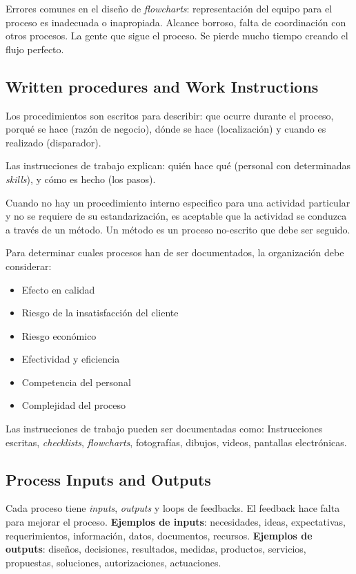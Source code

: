 \documentclass[]{article}
\begin{document}
Errores comunes en el diseño de \textit{flowcharts}: representación del equipo para el proceso es inadecuada o inapropiada. Alcance borroso, falta de coordinación con otros procesos. La gente que sigue el proceso. Se pierde mucho tiempo creando el flujo perfecto.

\subsection{Written procedures and Work Instructions} 

Los procedimientos son escritos para describir: que ocurre durante el proceso, porqué se hace (razón de negocio), dónde se hace (localización) y cuando es realizado (disparador).

Las instrucciones de trabajo explican: quién hace qué (personal con determinadas \textit{skills}), y cómo es hecho (los pasos). 

Cuando no hay un procedimiento interno especifico para una actividad particular y no se requiere de su estandarización, es aceptable que la actividad se conduzca a través de un método. Un método es un proceso no-escrito que debe ser seguido.

Para determinar cuales procesos han de ser documentados, la organización debe considerar: 

\begin{itemize}
	\item Efecto en calidad
	\item Riesgo de la insatisfacción del cliente
	\item Riesgo económico
	\item Efectividad y eficiencia
	\item Competencia del personal
	\item Complejidad del proceso
\end{itemize}

Las instrucciones de trabajo pueden ser documentadas como: Instrucciones escritas, \textit{checklists}, \textit{flowcharts}, fotografías, dibujos, videos, pantallas electrónicas.

\subsection{Process Inputs and Outputs}

Cada proceso tiene \textit{inputs}, \textit{outputs} y loops de feedbacks. El feedback hace falta para mejorar el proceso. \textbf{Ejemplos de \textbf{inputs}}: necesidades, ideas, expectativas, requerimientos, información, datos, documentos, recursos. \textbf{Ejemplos de \textbf{outputs}}: diseños, decisiones, resultados, medidas, productos, servicios, propuestas, soluciones, autorizaciones, actuaciones.
\end{document}
